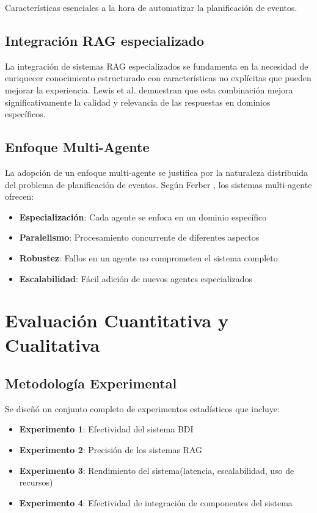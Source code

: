 \documentclass[runningheads,a4paper]{llncs}
\begin{document}
Características esenciales a la hora de automatizar la planificación de eventos.

\subsection{Integración RAG especializado}

La integración de sistemas RAG especializados se fundamenta en la necesidad de enriquecer conocimiento estructurado con características no explícitas que pueden mejorar la experiencia. Lewis et al. demuestran que esta combinación mejora significativamente la calidad y relevancia de las respuestas en dominios específicos.

\subsection{Enfoque Multi-Agente}

La adopción de un enfoque multi-agente se justifica por la naturaleza distribuida del problema de planificación de eventos. Según Ferber \cite{ferber1999multi}, los sistemas multi-agente ofrecen:

\begin{itemize}
    \item \textbf{Especialización}: Cada agente se enfoca en un dominio específico
    \item \textbf{Paralelismo}: Procesamiento concurrente de diferentes aspectos
    \item \textbf{Robustez}: Fallos en un agente no comprometen el sistema completo
    \item \textbf{Escalabilidad}: Fácil adición de nuevos agentes especializados
\end{itemize}

\section{Evaluación Cuantitativa y Cualitativa}

\subsection{Metodología Experimental}

Se diseñó un conjunto completo de experimentos estadísticos que incluye:

\begin{itemize}
    \item \textbf{Experimento 1}: Efectividad del sistema BDI
    \item \textbf{Experimento 2}: Precisión de los sistemas RAG
    \item \textbf{Experimento 3}: Rendimiento del sistema(latencia, escalabilidad, uso de recursos)
    \item \textbf{Experimento 4}: Efectividad de integración de componentes del sistema
\end{itemize}
\end{document}
